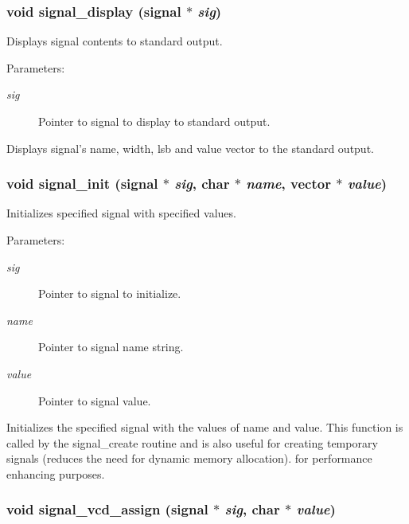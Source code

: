 \subsubsection{\setlength{\rightskip}{0pt plus 5cm}void signal\_\-display ({\bf signal} $\ast$ {\em sig})}\label{signal_8c_a9}


Displays signal contents to standard output.

\begin{Desc}
\item[Parameters:]
\begin{description}
\item[{\em sig}]Pointer to signal to display to standard output.\end{description}
\end{Desc}
Displays signal's name, width, lsb and value vector to the standard output. 
\subsubsection{\setlength{\rightskip}{0pt plus 5cm}void signal\_\-init ({\bf signal} $\ast$ {\em sig}, char $\ast$ {\em name}, {\bf vector} $\ast$ {\em value})}\label{signal_8c_a2}


Initializes specified signal with specified values.

\begin{Desc}
\item[Parameters:]
\begin{description}
\item[{\em sig}]Pointer to signal to initialize. \item[{\em name}]Pointer to signal name string. \item[{\em value}]Pointer to signal value.\end{description}
\end{Desc}
Initializes the specified signal with the values of name and value. This function is called by the signal\_\-create routine and is also useful for creating temporary signals (reduces the need for dynamic memory allocation). for performance enhancing purposes. 
\subsubsection{\setlength{\rightskip}{0pt plus 5cm}void signal\_\-vcd\_\-assign ({\bf signal} $\ast$ {\em sig}, char $\ast$ {\em value})}\label{signal_8c_a7}


